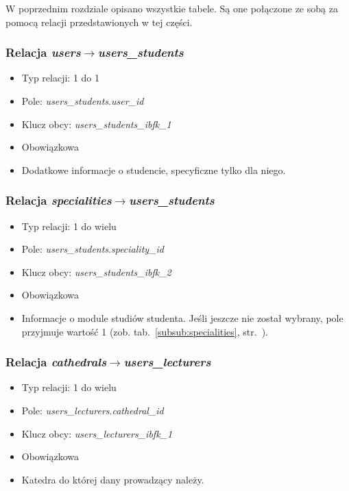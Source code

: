 \documentclass[a4paper,12pt,oneside]{report}
\begin{document}
W poprzednim rozdziale opisano wszystkie tabele. Są one połączone ze sobą za pomocą relacji przedstawionych w tej części.

\subsubsection{Relacja \emph{users}$\to$\emph{users\_students}}
\label{subsub:users-users_students}
\begin{itemize}
  \item Typ relacji: 1 do 1
  \item Pole: \emph{users\_students}.\emph{user\_id}
  \item Klucz obcy: \emph{users\_students\_ibfk\_1}
  \item Obowiązkowa
  \item Dodatkowe informacje o studencie, specyficzne tylko dla niego.
\end{itemize}

\subsubsection{Relacja \emph{specialities}$\to$\emph{users\_students}}
\label{subsub:specialities-users_students}
\begin{itemize}
  \item Typ relacji: 1 do wielu
  \item Pole: \emph{users\_students}.\emph{speciality\_id}
  \item Klucz obcy: \emph{users\_students\_ibfk\_2}
  \item Obowiązkowa
  \item Informacje o module studiów studenta. Jeśli jeszcze nie został wybrany, pole przyjmuje wartość 1 (zob. tab.~\ref{subsub:specialities}, str.~\pageref{subsub:specialities}).
\end{itemize}

\subsubsection{Relacja \emph{cathedrals}$\to$\emph{users\_lecturers}}
\label{subsub:cathedrals-users_lecturers}
\begin{itemize}
  \item Typ relacji: 1 do wielu
  \item Pole: \emph{users\_lecturers}.\emph{cathedral\_id}
  \item Klucz obcy: \emph{users\_lecturers\_ibfk\_1}
  \item Obowiązkowa
  \item Katedra do której dany prowadzący należy.
\end{itemize}
\end{document}
